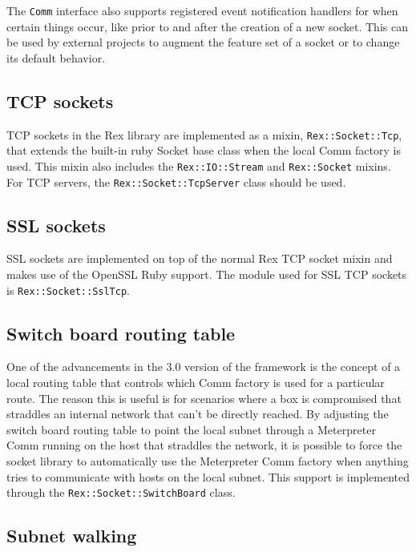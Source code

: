 \documentclass{report}
\begin{document}
\par
The \texttt{Comm} interface also supports registered event
notification handlers for when certain things occur, like prior to
and after the creation of a new socket.  This can be used by
external projects to augment the feature set of a socket or to
change its default behavior.

        \subsection{TCP sockets}

\par
TCP sockets in the Rex library are implemented as a mixin,
\texttt{Rex::Socket::Tcp}, that extends the built-in ruby Socket
base class when the local Comm factory is used.  This mixin also
includes the \texttt{Rex::IO::Stream} and \texttt{Rex::Socket}
mixins.  For TCP servers, the \texttt{Rex::Socket::TcpServer} class
should be used.

        \subsection{SSL sockets}

\par
SSL sockets are implemented on top of the normal Rex TCP socket
mixin and makes use of the OpenSSL Ruby support.  The module used
for SSL TCP sockets is \texttt{Rex::Socket::SslTcp}.

        \subsection{Switch board routing table}

\par
One of the advancements in the 3.0 version of the framework is the
concept of a local routing table that controls which Comm factory is
used for a particular route.  The reason this is useful is for
scenarios where a box is compromised that straddles an internal
network that can't be directly reached.  By adjusting the switch
board routing table to point the local subnet through a Meterpreter
Comm running on the host that straddles the network, it is possible
to force the socket library to automatically use the Meterpreter
Comm factory when anything tries to communicate with hosts on the
local subnet.  This support is implemented through the
\texttt{Rex::Socket::SwitchBoard} class.

        \subsection{Subnet walking}
\end{document}

